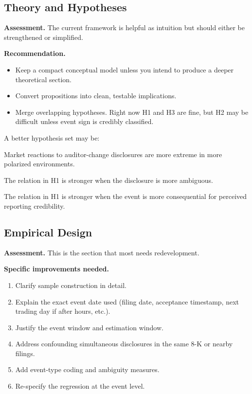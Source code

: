 \documentclass[12pt]{article}
\begin{document}
\subsection{Theory and Hypotheses}
\textbf{Assessment.} The current framework is helpful as intuition but should either be strengthened or simplified.

\textbf{Recommendation.}
\begin{itemize}[leftmargin=2em]
    \item Keep a compact conceptual model unless you intend to produce a deeper theoretical section.
    \item Convert propositions into clean, testable implications.
    \item Merge overlapping hypotheses. Right now H1 and H3 are fine, but H2 may be difficult unless event sign is credibly classified.
\end{itemize}

A better hypothesis set may be:
\begin{description}[leftmargin=2em,style=nextline]
    \item[H1:] Market reactions to auditor-change disclosures are more extreme in more polarized environments.
    \item[H2:] The relation in H1 is stronger when the disclosure is more ambiguous.
    \item[H3:] The relation in H1 is stronger when the event is more consequential for perceived reporting credibility.
\end{description}

\subsection{Empirical Design}
\textbf{Assessment.} This is the section that most needs redevelopment.

\textbf{Specific improvements needed.}
\begin{enumerate}[leftmargin=2em]
    \item Clarify sample construction in detail.
    \item Explain the exact event date used (filing date, acceptance timestamp, next trading day if after hours, etc.).
    \item Justify the event window and estimation window.
    \item Address confounding simultaneous disclosures in the same 8-K or nearby filings.
    \item Add event-type coding and ambiguity measures.
    \item Re-specify the regression at the event level.
\end{enumerate}
\end{document}

